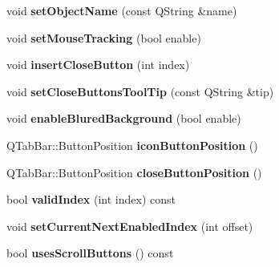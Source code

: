 \begin{DoxyCompactItemize}
\item 
\hypertarget{class_combo_tab_bar_ac6f8d027c5eb9eb4976b7f26460749b2}{
void {\bfseries setObjectName} (const QString \&name)}
\label{class_combo_tab_bar_ac6f8d027c5eb9eb4976b7f26460749b2}

\item 
\hypertarget{class_combo_tab_bar_a239981b4576b3bf469e88c950cdf9379}{
void {\bfseries setMouseTracking} (bool enable)}
\label{class_combo_tab_bar_a239981b4576b3bf469e88c950cdf9379}

\item 
\hypertarget{class_combo_tab_bar_ae7a4dde371b625f854275f230520609b}{
void {\bfseries insertCloseButton} (int index)}
\label{class_combo_tab_bar_ae7a4dde371b625f854275f230520609b}

\item 
\hypertarget{class_combo_tab_bar_aad29454b7b4152316af1bceec0ea65d1}{
void {\bfseries setCloseButtonsToolTip} (const QString \&tip)}
\label{class_combo_tab_bar_aad29454b7b4152316af1bceec0ea65d1}

\item 
\hypertarget{class_combo_tab_bar_a6fabbea88ffb64b3c3767f2b40d66174}{
void {\bfseries enableBluredBackground} (bool enable)}
\label{class_combo_tab_bar_a6fabbea88ffb64b3c3767f2b40d66174}

\item 
\hypertarget{class_combo_tab_bar_a75522212d8babac303f31b5aca1f855f}{
QTabBar::ButtonPosition {\bfseries iconButtonPosition} ()}
\label{class_combo_tab_bar_a75522212d8babac303f31b5aca1f855f}

\item 
\hypertarget{class_combo_tab_bar_a1c8c4005030156e07db4b49ab5324714}{
QTabBar::ButtonPosition {\bfseries closeButtonPosition} ()}
\label{class_combo_tab_bar_a1c8c4005030156e07db4b49ab5324714}

\item 
\hypertarget{class_combo_tab_bar_ac3ba8a576a1bde1b246701f4c1708232}{
bool {\bfseries validIndex} (int index) const }
\label{class_combo_tab_bar_ac3ba8a576a1bde1b246701f4c1708232}

\item 
\hypertarget{class_combo_tab_bar_aeef10920a84647ed1b457b8b9cfb19a9}{
void {\bfseries setCurrentNextEnabledIndex} (int offset)}
\label{class_combo_tab_bar_aeef10920a84647ed1b457b8b9cfb19a9}

\item 
\hypertarget{class_combo_tab_bar_a380190b950a2070287ee79cf8ff3b47d}{
bool {\bfseries usesScrollButtons} () const }
\label{class_combo_tab_bar_a380190b950a2070287ee79cf8ff3b47d}


\end{DoxyCompactItemize}
